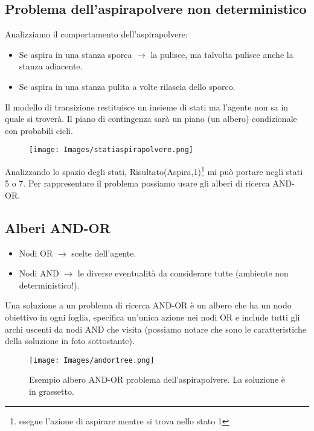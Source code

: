 \documentclass{article}
\begin{document}
\subsection{Problema dell'aspirapolvere non deterministico}
Analizziamo il comportamento dell'aspirapolvere:
\begin{itemize}
    \item Se aspira in una stanza sporca $\rightarrow$ la pulisce, ma talvolta pulisce anche la stanza adiacente.
    \item Se aspira in una stanza pulita a volte rilascia dello sporco.
\end{itemize}
Il modello di transizione restituisce un insieme di stati ma l'agente non sa in quale si troverà. Il piano di contingenza sarà un piano (un albero) condizionale con probabili cicli.
\begin{figure}[H]
    \centering
    \texttt{[image: Images/statiaspirapolvere.png]}
\end{figure}
Analizzando lo spazio degli stati, Risultato(Aspira,1)\footnote{esegue l'azione di aspirare mentre si trova nello stato 1} mi può portare negli stati 5 o 7. Per rappresentare il problema possiamo usare gli alberi di ricerca AND-OR.

\subsection{Alberi AND-OR}
\begin{itemize}
    \item Nodi OR $\rightarrow$ scelte dell'agente.
    \item Nodi AND $\rightarrow$ le diverse eventualità da considerare tutte (ambiente non deterministico!).
\end{itemize}
Una soluzione a un problema di ricerca AND-OR è un albero che ha un nodo obiettivo in ogni foglia, specifica un'unica azione nei nodi OR e include tutti gli archi uscenti da nodi AND che visita (possiamo notare che sono le caratteristiche della soluzione in foto sottostante).
\clearpage
\begin{figure}[H]
    \centering
    \texttt{[image: Images/andortree.png]}
    \caption{Esempio albero AND-OR problema dell'aspirapolvere. La soluzione è in grassetto.}
\end{figure}
\end{document}

